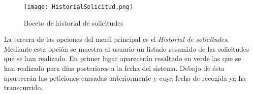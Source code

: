   \begin{figure}[H]
\centering
	\texttt{[image: HistorialSolicitud.png]} 
\caption{Boceto de historial de solicitudes}
\end{figure}
La tercera de las opciones del menú principal es el \textit{Historial de solicitudes}. Mediante esta opción se muestra al usuario un listado resumido de las solicitudes que se han realizado. En primer lugar aparecerán resaltado en verde las que se han realizado para días posteriores a la fecha del sistema. Debajo de ésta aparecerán las peticiones cursadas anteriormente y cuya fecha de recogida ya ha transcurrido. \\